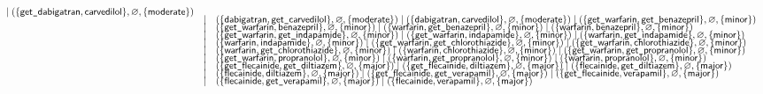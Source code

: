 \begin{figure}[t]
\[\begin{array}{rcl}
\mid  (\{\mathsf{get}\texttt{\_}\mathsf{dabigatran},\mathsf{carvedilol}\},\varnothing,\{\mathsf{moderate}\})
\\[-4pt] & \mid &  (\{\mathsf{dabigatran},\mathsf{get}\texttt{\_}\mathsf{carvedilol}\},\varnothing,\{\mathsf{moderate}\})
\mid  (\{\mathsf{dabigatran},\mathsf{carvedilol}\},\varnothing,\{\mathsf{moderate}\})
\mid  (\{\mathsf{get}\texttt{\_}\mathsf{warfarin},\mathsf{get}\texttt{\_}\mathsf{benazepril}\},\varnothing,\{\mathsf{minor}\})
\\[-4pt] & \mid &  (\{\mathsf{get}\texttt{\_}\mathsf{warfarin},\mathsf{benazepril}\},\varnothing,\{\mathsf{minor}\})
\mid  (\{\mathsf{warfarin},\mathsf{get}\texttt{\_}\mathsf{benazepril}\},\varnothing,\{\mathsf{minor}\})
\mid  (\{\mathsf{warfarin},\mathsf{benazepril}\},\varnothing,\{\mathsf{minor}\})
\\[-4pt] & \mid &  (\{\mathsf{get}\texttt{\_}\mathsf{warfarin},\mathsf{get}\texttt{\_}\mathsf{indapamide}\},\varnothing,\{\mathsf{minor}\})
\mid  (\{\mathsf{get}\texttt{\_}\mathsf{warfarin},\mathsf{indapamide}\},\varnothing,\{\mathsf{minor}\})
\mid  (\{\mathsf{warfarin},\mathsf{get}\texttt{\_}\mathsf{indapamide}\},\varnothing,\{\mathsf{minor}\})
\\[-4pt] & \mid &  (\{\mathsf{warfarin},\mathsf{indapamide}\},\varnothing,\{\mathsf{minor}\})
\mid  (\{\mathsf{get}\texttt{\_}\mathsf{warfarin},\mathsf{get}\texttt{\_}\mathsf{chlorothiazide}\},\varnothing,\{\mathsf{minor}\})
\mid  (\{\mathsf{get}\texttt{\_}\mathsf{warfarin},\mathsf{chlorothiazide}\},\varnothing,\{\mathsf{minor}\})
\\[-4pt] & \mid &  (\{\mathsf{warfarin},\mathsf{get}\texttt{\_}\mathsf{chlorothiazide}\},\varnothing,\{\mathsf{minor}\})
\mid  (\{\mathsf{warfarin},\mathsf{chlorothiazide}\},\varnothing,\{\mathsf{minor}\})
\mid  (\{\mathsf{get}\texttt{\_}\mathsf{warfarin},\mathsf{get}\texttt{\_}\mathsf{propranolol}\},\varnothing,\{\mathsf{minor}\})
\\[-4pt] & \mid &  (\{\mathsf{get}\texttt{\_}\mathsf{warfarin},\mathsf{propranolol}\},\varnothing,\{\mathsf{minor}\})
\mid  (\{\mathsf{warfarin},\mathsf{get}\texttt{\_}\mathsf{propranolol}\},\varnothing,\{\mathsf{minor}\})
\mid  (\{\mathsf{warfarin},\mathsf{propranolol}\},\varnothing,\{\mathsf{minor}\})
\\[-4pt] & \mid &  (\{\mathsf{get}\texttt{\_}\mathsf{flecainide},\mathsf{get}\texttt{\_}\mathsf{diltiazem}\},\varnothing,\{\mathsf{major}\})
\mid  (\{\mathsf{get}\texttt{\_}\mathsf{flecainide},\mathsf{diltiazem}\},\varnothing,\{\mathsf{major}\})
\mid  (\{\mathsf{flecainide},\mathsf{get}\texttt{\_}\mathsf{diltiazem}\},\varnothing,\{\mathsf{major}\})
\\[-4pt] & \mid &  (\{\mathsf{flecainide},\mathsf{diltiazem}\},\varnothing,\{\mathsf{major}\})
\mid  (\{\mathsf{get}\texttt{\_}\mathsf{flecainide},\mathsf{get}\texttt{\_}\mathsf{verapamil}\},\varnothing,\{\mathsf{major}\})
\mid  (\{\mathsf{get}\texttt{\_}\mathsf{flecainide},\mathsf{verapamil}\},\varnothing,\{\mathsf{major}\})
\\[-4pt] & \mid &  (\{\mathsf{flecainide},\mathsf{get}\texttt{\_}\mathsf{verapamil}\},\varnothing,\{\mathsf{major}\})
\mid  (\{\mathsf{flecainide},\mathsf{verapamil}\},\varnothing,\{\mathsf{major}\})

\end{array}\]
\end{figure}
